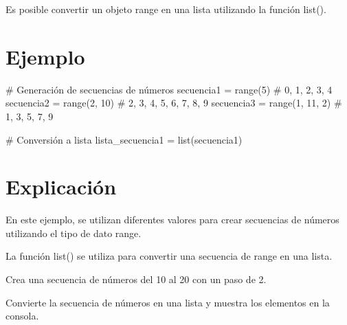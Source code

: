 \documentclass[
  a4paper,
  DIV=11,
  numbers=noendperiod,
  onepage,
  openany]{scrreprt}
\newenvironment{Shaded}{\begin{snugshade}}{\end{snugshade}}
\newcommand{\BuiltInTok}[1]{\textcolor[rgb]{0.00,0.23,0.31}{#1}}
\newcommand{\CommentTok}[1]{\textcolor[rgb]{0.37,0.37,0.37}{#1}}
\newcommand{\DecValTok}[1]{\textcolor[rgb]{0.68,0.00,0.00}{#1}}
\newcommand{\NormalTok}[1]{\textcolor[rgb]{0.00,0.23,0.31}{#1}}
\newcommand{\OperatorTok}[1]{\textcolor[rgb]{0.37,0.37,0.37}{#1}}
\begin{document}
Es posible convertir un objeto range en una lista utilizando la función
list().

\hypertarget{ejemplo-22}{%
\section{Ejemplo}\label{ejemplo-22}}

\begin{Shaded}
\begin{Highlighting}[]
\CommentTok{\# Generación de secuencias de números}
\NormalTok{secuencia1 }\OperatorTok{=} \BuiltInTok{range}\NormalTok{(}\DecValTok{5}\NormalTok{)          }\CommentTok{\# 0, 1, 2, 3, 4}
\NormalTok{secuencia2 }\OperatorTok{=} \BuiltInTok{range}\NormalTok{(}\DecValTok{2}\NormalTok{, }\DecValTok{10}\NormalTok{)      }\CommentTok{\# 2, 3, 4, 5, 6, 7, 8, 9}
\NormalTok{secuencia3 }\OperatorTok{=} \BuiltInTok{range}\NormalTok{(}\DecValTok{1}\NormalTok{, }\DecValTok{11}\NormalTok{, }\DecValTok{2}\NormalTok{)   }\CommentTok{\# 1, 3, 5, 7, 9}

\CommentTok{\# Conversión a lista}
\NormalTok{lista\_secuencia1 }\OperatorTok{=} \BuiltInTok{list}\NormalTok{(secuencia1)}
\end{Highlighting}
\end{Shaded}

\hypertarget{explicaciuxf3n-22}{%
\section{Explicación}\label{explicaciuxf3n-22}}

En este ejemplo, se utilizan diferentes valores para crear secuencias de
números utilizando el tipo de dato range.

La función list() se utiliza para convertir una secuencia de range en
una lista.

\begin{tcolorbox}[enhanced jigsaw, colbacktitle=quarto-callout-important-color!10!white, toprule=.15mm, leftrule=.75mm, titlerule=0mm, opacityback=0, rightrule=.15mm, opacitybacktitle=0.6, breakable, left=2mm, coltitle=black, title=\textcolor{quarto-callout-important-color}{\faExclamation}\hspace{0.5em}{Actividad Práctica:}, toptitle=1mm, bottomtitle=1mm, arc=.35mm, bottomrule=.15mm, colback=white, colframe=quarto-callout-important-color-frame]

Crea una secuencia de números del 10 al 20 con un paso de 2.

Convierte la secuencia de números en una lista y muestra los elementos
en la consola.

\end{tcolorbox}
\end{document}
